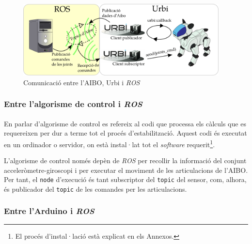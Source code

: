 \documentclass[12pt,a4paper,final,twoside]{article}
\begin{document}
\begin{figure}[tb]
\centering
\includegraphics[width=0.95\textwidth]{Imatges/Comunicacio-ROS-Urbi-Aibo.pdf}
\caption{Comunicació entre l'AIBO, Urbi i \textit{ROS}}
\label{fig:Comunicacio-ROS-Urbi-AIBO}
\end{figure}


\subsubsection{Entre l'algorisme de control i \textit{ROS}}

\paragraph{}En parlar d'algorisme de control es refereix al codi que processa els càlculs que es requereixen per dur a terme tot el procés d'estabilització. Aquest codi és executat en un ordinador o servidor, on està instal·lat tot el \textit{software} requerit\footnote{El procés d'instal·lació està explicat en els Annexos.}. 

L'algorisme de control només depèn de \textit{ROS} per recollir la informació del conjunt acceleròmetre-giroscopi i per executar el moviment de les articulacions de l'AIBO. Per tant, el \texttt{node} d'execució és tant subscriptor del \texttt{topic} del sensor, com, alhora, és publicador del \texttt{topic} de les comandes per les articulacions.


\subsubsection{Entre l'Arduino i \textit{ROS}}
\label{comunicacio-ROS-Arduino}

\end{document}
